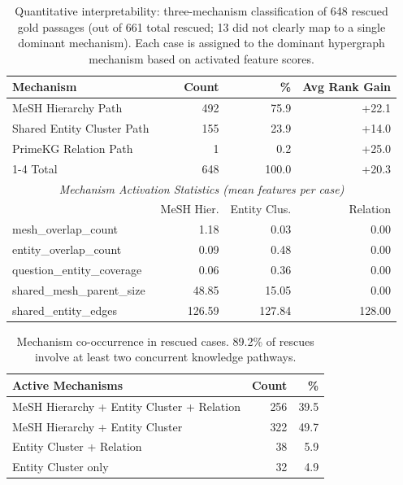 \begin{table}[t]
\centering
\small
\caption{Quantitative interpretability: three-mechanism classification of 648 rescued gold passages (out of 661 total rescued; 13 did not clearly map to a single dominant mechanism). Each case is assigned to the dominant hypergraph mechanism based on activated feature scores.}
\label{tab:interpretability-mechanisms}
\begin{tabular}{lrrr}
\toprule
Mechanism & Count & \% & Avg Rank Gain \\
\midrule
MeSH Hierarchy Path & 492 & 75.9 & +22.1 \\
Shared Entity Cluster Path & 155 & 23.9 & +14.0 \\
PrimeKG Relation Path & 1 & 0.2 & +25.0 \\
\cmidrule{1-4}
Total & 648 & 100.0 & +20.3 \\
\midrule
\multicolumn{4}{c}{\textit{Mechanism Activation Statistics (mean features per case)}} \\
\midrule
 & MeSH Hier. & Entity Clus. & Relation \\
\midrule
mesh\_overlap\_count & 1.18 & 0.03 & 0.00 \\
entity\_overlap\_count & 0.09 & 0.48 & 0.00 \\
question\_entity\_coverage & 0.06 & 0.36 & 0.00 \\
shared\_mesh\_parent\_size & 48.85 & 15.05 & 0.00 \\
shared\_entity\_edges & 126.59 & 127.84 & 128.00 \\
\bottomrule
\end{tabular}
\end{table}

\begin{table}[t]
\centering
\small
\caption{Mechanism co-occurrence in rescued cases. 89.2\% of rescues involve at least two concurrent knowledge pathways.}
\label{tab:mech-cooccurrence}
\begin{tabular}{lrr}
\toprule
Active Mechanisms & Count & \% \\
\midrule
MeSH Hierarchy + Entity Cluster + Relation & 256 & 39.5 \\
MeSH Hierarchy + Entity Cluster & 322 & 49.7 \\
Entity Cluster + Relation & 38 & 5.9 \\
Entity Cluster only & 32 & 4.9 \\
\bottomrule
\end{tabular}
\end{table}
